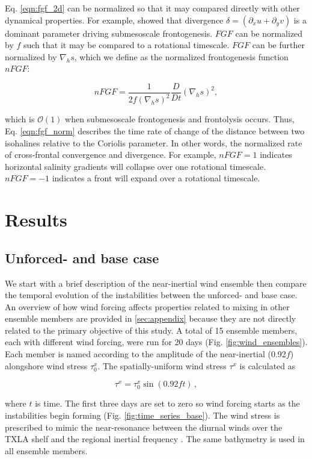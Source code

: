 \documentclass[draft]{agujournal2019}
\begin{document}
Eq. \ref{eqn:fgf_2d} can be normalized so that it may compared directly with other dynamical properties. For example,  showed that divergence $\delta  = (\partial_x u + \partial_y v)$ is a dominant parameter driving submesoscale frontogenesis. $FGF$ can be normalized by $f$ such that it may be compared to a rotational timescale. $FGF$ can be further normalized by $\nabla_h s$, which we define as the normalized frontogenesis function $nFGF$:
\begin{linenomath*}
    \begin{equation} \label{eqn:fgf_norm}
        nFGF = \frac{1}{2f \left(\nabla_h s \right)^2}\frac{D}{Dt} \left(\nabla_h s \right)^2,
    \end{equation}
\end{linenomath*}
which is $\mathcal{O}(1)$ when submesoscale frontogenesis and frontolysis occurs. Thus, Eq. \ref{eqn:fgf_norm} describes the time rate of change of the distance between two isohalines relative to the Coriolis parameter. In other words, the normalized rate of cross-frontal convergence and divergence. For example, $nFGF=1$ indicates horizontal salinity gradients will collapse over one rotational timescale. $nFGF = -1$ indicates a front will expand over a rotational timescale. 

\section{Results} \label{sec:results}
\subsection{Unforced- and base case}
We start with a brief description of the near-inertial wind ensemble then compare the temporal evolution of the instabilities between the unforced- and base case. An overview of how wind forcing affects properties related to mixing in other ensemble members are provided in \ref{sec:appendix} because they are not directly related to the primary objective of this study. A total of 15 ensemble members, each with different wind forcing, were run for 20 days (Fig. \ref{fig:wind_ensembles}). Each member is named according to the amplitude of the near-inertial (0.92$f$) alongshore wind stress $\tau_0^x$. The spatially-uniform wind stress $\tau^x$ is calculated as
\begin{linenomath*}
    \begin{equation}
        \tau^x = \tau_0^x \sin(0.92 f t) \, , 
    \end{equation}
\end{linenomath*}
where $t$ is time. The first three days are set to zero so wind forcing starts as the instabilities begin forming (Fig. \ref{fig:time_series_base}). The wind stress is prescribed to mimic the near-resonance between the diurnal winds over the TXLA shelf and the regional inertial frequency \cite{Qu_2022_NIW}. The same bathymetry is used in all ensemble members.
\end{document}
